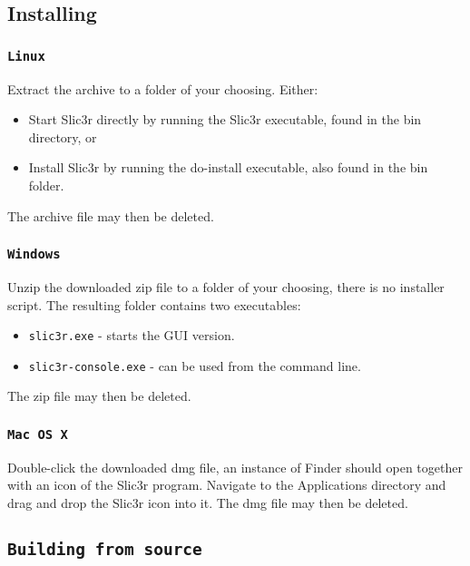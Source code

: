 
\subsection{Installing}

\subsubsection{\texttt{Linux}}

Extract the archive to a folder of your choosing.
Either:
\begin{itemize}
\item Start Slic3r directly by running the Slic3r executable, found in the bin directory, or
\item Install Slic3r by running the do-install executable, also found in the bin folder.
\end{itemize}
The archive file may then be deleted.

\subsubsection{\texttt{Windows}}

Unzip the downloaded zip file to a folder of your choosing, there is no installer script. The resulting folder contains two executables:
\begin{itemize}
\item \texttt{slic3r.exe} - starts the GUI version.
\item \texttt{slic3r-console.exe} - can be used from the command line.
\end{itemize}

The zip file may then be deleted.

\subsubsection{\texttt{Mac OS X}}

Double-click the downloaded dmg file, an instance of Finder should open together with an icon of the Slic3r program.  Navigate to the Applications directory and drag and drop the Slic3r icon into it.
The dmg file may then be deleted.



\subsection{\texttt{Building from source}} %
\label{sec:building_from_source}

